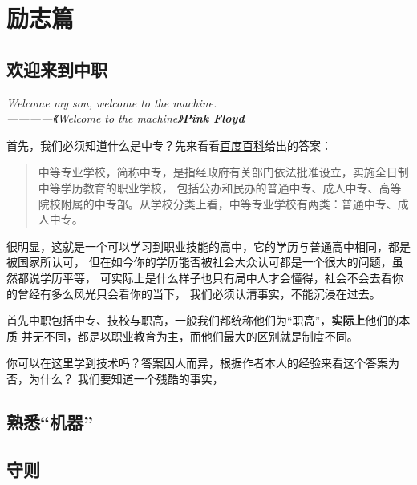 \section{励志篇}

\subsection{欢迎来到中职}

\begin{center}
    \emph{Welcome my son, welcome to the machine.\\————《Welcome to the machine》\textbf{Pink Floyd}}
\end{center}

首先，我们必须知道什么是中专？先来看看\href{https://baike.baidu.com/item/%E4%B8%AD%E7%AD%89%E4%B8%93%E4%B8%9A%E5%AD%A6%E6%A0%A1/1917836}{百度百科}给出的答案：

\begin{abstract}
    中等专业学校，简称中专，是指经政府有关部门依法批准设立，实施全日制中等学历教育的职业学校，
    包括公办和民办的普通中专、成人中专、高等院校附属的中专部。从学校分类上看，中等专业学校有两类：普通中专、成人中专。
\end{abstract}

很明显，这就是一个可以学习到职业技能的高中，它的学历与普通高中相同，都是被国家所认可，
但在如今你的学历能否被社会大众认可都是一个很大的问题，虽然都说学历平等，
可实际上是什么样子也只有局中人才会懂得，社会不会去看你的曾经有多么风光只会看你的当下，
我们必须认清事实，不能沉浸在过去。

首先中职包括中专、技校与职高，一般我们都统称他们为“职高”，\textbf{实际上}他们的本质
并无不同，都是以职业教育为主，而他们最大的区别就是制度不同。

你可以在这里学到技术吗？答案因人而异，根据作者本人的经验来看这个答案为否，为什么？
我们要知道一个残酷的事实，

\subsection{熟悉“机器”}

\subsection{守则}